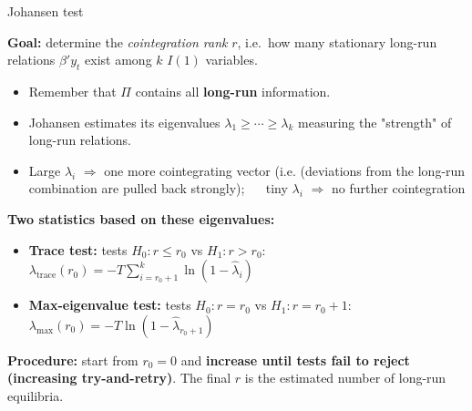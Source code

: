 \documentclass{beamer}
\begin{document}
\begin{frame}{Johansen test}
\footnotesize

\textbf{Goal:} determine the \emph{cointegration rank} $r$, i.e.\ how many stationary long-run relations $\beta'y_t$ exist among $k$ $I(1)$ variables.

\medskip

\begin{itemize}
  \item Remember that $\Pi$ contains all \textbf{long-run} information.
  \item Johansen estimates its eigenvalues $\lambda_1 \ge \cdots \ge \lambda_k$ 
        measuring the "strength" of long-run relations.
  \item Large $\lambda_i$ $\Rightarrow$ one more cointegrating vector (i.e.  (deviations from the long-run combination are pulled back strongly); $\quad$ tiny $\lambda_i$ $\Rightarrow$ no further cointegration
\end{itemize}

\medskip

\textbf{Two statistics based on these eigenvalues:}
\begin{itemize}
  \item \textbf{Trace test:} tests $H_0: r \le r_0$ vs $H_1: r > r_0$:\quad $\lambda_{\mathrm{trace}}(r_0)=-T\displaystyle\sum_{i=r_0+1}^{k}\ln(1-\hat{\lambda}_i)$
  \item \textbf{Max-eigenvalue test:} tests $H_0: r=r_0$ vs $H_1: r=r_0+1$:\quad $\lambda_{\max}(r_0)=-T\ln(1-\hat{\lambda}_{r_0+1})$
  \end{itemize}
\medskip

\textbf{Procedure:} start from $r_0=0$ and \textbf{increase until tests fail to reject (increasing try-and-retry)}. The final $r$ is the estimated number of long-run equilibria.
\end{frame}
\end{document}
